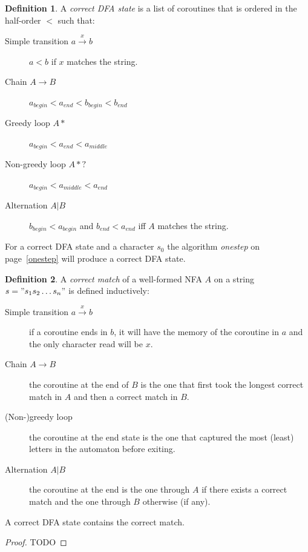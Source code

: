 \documentclass[11pt]{Thesis}
\theoremstyle{definition}
\newtheorem*{defn}{Definition}
\begin{document}
\begin{defn}
  A \emph{correct DFA state} is a list of coroutines that is ordered in the 
  half-order $<$ such that:
  \begin{description}
    \item[Simple transition $a\xrightarrow{x} b$] $a<b$ if $x$ matches the 
      string.
    \item[Chain $A\rightarrow B$] $a_{begin}<a_{end}<b_{begin}<b_{end}$
    \item[Greedy loop $A*$] $a_{begin} < a_{end} < a_{middle}$
    \item[Non-greedy loop $A*?$] $a_{begin} < a_{middle} < a_{end}$
    \item[Alternation $A|B$] $b_{begin} < a_{begin}$ and 
      $b_{end} < a_{end}$ iff $A$ matches the string.
  \end{description}
\end{defn}

\begin{lemma}
  For a correct DFA state and a character $s_0$ the algorithm \emph{onestep} on
  page~\ref{onestep} will produce a correct DFA state.
\end{lemma}

\begin{defn}
  A \emph{correct match} of a well-formed NFA $A$ on a string 
  $s="s_1s_2\dots s_n"$ is defined inductively:

  \begin{description}
    \item[Simple transition $a\xrightarrow{x} b$] if a coroutine ends in $b$, 
      it will have the memory of the coroutine in $a$ and the only character 
      read will be $x$.
    \item[Chain $A\rightarrow B$] the coroutine at the end of $B$ is the one 
      that first took the longest correct match in $A$ and then a correct 
      match in $B$.
    \item[(Non-)greedy loop] the coroutine at the end state is the one that 
      captured the most (least) letters in the automaton before exiting.
    \item[Alternation $A|B$] the coroutine at the end is the one through $A$ 
      if there exists a correct match and the one through $B$ otherwise (if any).
  \end{description}
\end{defn}

\begin{lemma}
  A correct DFA state contains the correct match.
\end{lemma}
\begin{proof}
  TODO
\end{proof}
\end{document}
